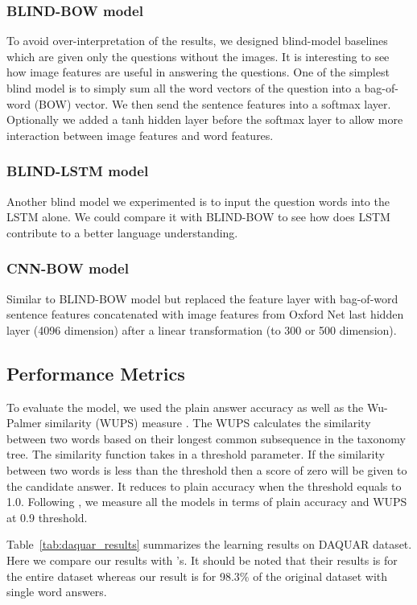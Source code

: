 \documentclass{article}
\renewcommand{\#}[1]{\textbf{#1}}
\begin{document}
\subsubsection{BLIND-BOW model}
To avoid over-interpretation of the results, we designed blind-model baselines which are given only the questions without the images. It is interesting to see how image features are useful in answering the questions. One of the simplest blind model is to simply sum all the word vectors of the question into a bag-of-word (BOW) vector. We then send the sentence features into a softmax layer. Optionally we added a tanh hidden layer before the softmax layer to allow more interaction between image features and word features.

\subsubsection{BLIND-LSTM model}
Another blind model we experimented is to input the question words into the LSTM alone. We could compare it with BLIND-BOW to see how does LSTM contribute to a better language understanding.

\subsubsection{CNN-BOW model}
Similar to BLIND-BOW model but replaced the feature layer with bag-of-word sentence features concatenated with image features from Oxford Net last hidden layer (4096 dimension) after a linear transformation (to 300 or 500 dimension).

\subsection{Performance Metrics}
To evaluate the model, we used the plain answer accuracy as well as the Wu-Palmer similarity (WUPS) measure \cite{wu94, malinowski14b}. The WUPS calculates the similarity between two words based on their longest common subsequence in the taxonomy tree. The similarity function takes in a threshold parameter. If the similarity between two words is less than the threshold then a score of zero will be given to the candidate answer. It reduces to plain accuracy when the threshold equals to 1.0. Following \cite{malinowski14b}, we measure all the models in terms of plain accuracy and WUPS at 0.9 threshold.

Table~\ref{tab:daquar_results} summarizes the learning results on DAQUAR dataset. Here we compare our results with \cite{malinowski14b}'s. It should be noted that their results is for the entire dataset whereas our result is for 98.3\% of the original dataset with single word answers.
\end{document}
